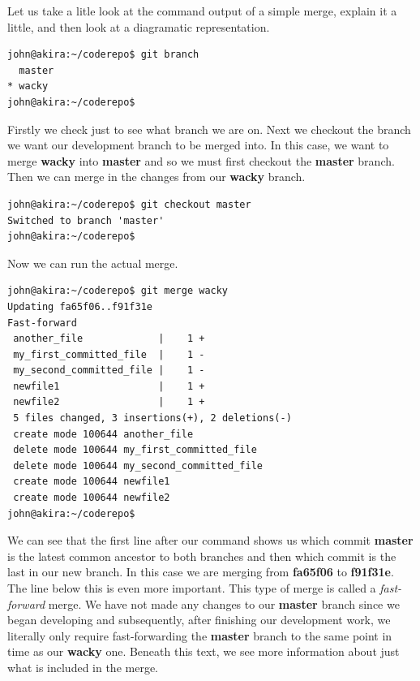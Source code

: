 Let us take a litle look at the command output of a simple merge, explain it a little, and then look at a diagramatic representation.

\begin{Verbatim}[frame=leftline,framerule=1mm,fontsize=\relsize{-3}] 
john@akira:~/coderepo$ git branch
  master
* wacky
john@akira:~/coderepo$ 
\end{Verbatim}

Firstly we check just to see what branch we are on.  Next we checkout the branch we want our development branch to be merged into.  In this case, we want to merge \textbf{wacky} into \textbf{master} and so we must first checkout the \textbf{master} branch.  Then we can merge in the changes from our \textbf{wacky} branch.

\begin{Verbatim}[frame=leftline,framerule=1mm,fontsize=\relsize{-3}] 
john@akira:~/coderepo$ git checkout master
Switched to branch 'master'
john@akira:~/coderepo$ 
\end{Verbatim}

Now we can run the actual merge.

\begin{Verbatim}[frame=leftline,framerule=1mm,fontsize=\relsize{-3}] 
john@akira:~/coderepo$ git merge wacky 
Updating fa65f06..f91f31e
Fast-forward
 another_file             |    1 +
 my_first_committed_file  |    1 -
 my_second_committed_file |    1 -
 newfile1                 |    1 +
 newfile2                 |    1 +
 5 files changed, 3 insertions(+), 2 deletions(-)
 create mode 100644 another_file
 delete mode 100644 my_first_committed_file
 delete mode 100644 my_second_committed_file
 create mode 100644 newfile1
 create mode 100644 newfile2
john@akira:~/coderepo$
\end{Verbatim} 

We can see that the first line after our command shows us which commit \textbf{master} is the latest common ancestor to both branches and then which commit is the last in our new branch.  In this case we are merging from \textbf{fa65f06} to \textbf{f91f31e}.  The line below this is even more important.  This type of merge is called a \emph{fast-forward} merge.  We have not made any changes to our \textbf{master} branch since we began developing and subsequently, after finishing our development work, we literally only require fast-forwarding the \textbf{master} branch to the same point in time as our \textbf{wacky} one.  Beneath this text, we see more information about just what is included in the merge.  

